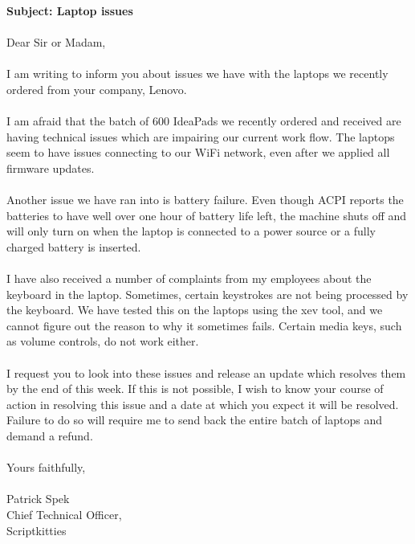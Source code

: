 \documentclass[11pt,english]{article}
\begin{document}
  \textbf{Subject: Laptop issues}

  \paragraph{}
  Dear Sir or Madam,
\\ \\
  I am writing to inform you about issues we have with the laptops we recently
  ordered from your company, Lenovo.
\\ \\ 
  I am afraid that the batch of 600 IdeaPads we recently ordered and received
  are having technical issues which are impairing our current work flow. The
  laptops seem to have issues connecting to our WiFi network, even after we
  applied all firmware updates.
\\ \\
  Another issue we have ran into is battery failure. Even though ACPI reports
  the batteries to have well over one hour of battery life left, the machine
  shuts off and will only turn on when the laptop is connected to a power source
  or a fully charged battery is inserted.
\\ \\
  I have also received a number of complaints from my employees about the
  keyboard in the laptop. Sometimes, certain keystrokes are not being processed
  by the keyboard. We have tested this on the laptops using the xev tool, and we
  cannot figure out the reason to why it sometimes fails. Certain media keys,
  such as volume controls, do not work either.
\\ \\
  I request you to look into these issues and release an update which resolves
  them by the end of this week. If this is not possible, I wish to know your
  course of action in resolving this issue and a date at which you expect it will
  be resolved. Failure to do so will require me to send back the entire batch of
  laptops and demand a refund.

  \paragraph{}
  Yours faithfully,
  \\ \\
  Patrick Spek \\
  Chief Technical Officer, \\
  Scriptkitties
\end{document}
